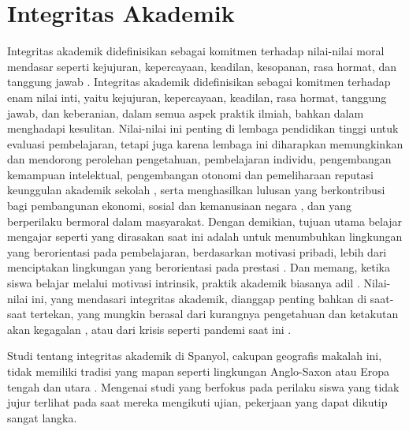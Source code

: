 \section{Integritas Akademik}
\label{sec:integritasakademik}

Integritas akademik didefinisikan sebagai komitmen terhadap nilai-nilai moral mendasar seperti kejujuran, kepercayaan, keadilan, kesopanan, rasa hormat, dan tanggung jawab \citet{keohane1999fundamental}. Integritas akademik didefinisikan sebagai komitmen terhadap enam nilai inti, yaitu kejujuran, kepercayaan, keadilan, rasa hormat, tanggung jawab, dan keberanian, dalam semua aspek praktik ilmiah, bahkan dalam menghadapi kesulitan. Nilai-nilai ini penting di lembaga pendidikan tinggi untuk evaluasi pembelajaran, tetapi juga karena lembaga ini diharapkan memungkinkan dan mendorong perolehan pengetahuan, pembelajaran individu, pengembangan kemampuan intelektual, pengembangan otonomi dan pemeliharaan reputasi keunggulan akademik sekolah \citep{ahmed2018student} \citep{nuss1984academic}, serta menghasilkan lulusan yang berkontribusi bagi pembangunan ekonomi, sosial dan kemanusiaan negara \citep{muhammad2020factors}, dan yang berperilaku bermoral dalam masyarakat. Dengan demikian, tujuan utama belajar mengajar seperti yang dirasakan saat ini adalah untuk menumbuhkan lingkungan yang berorientasi pada pembelajaran, berdasarkan motivasi pribadi, lebih dari menciptakan lingkungan yang berorientasi pada prestasi \citep{bertram2017academic}. Dan memang, ketika siswa belajar melalui motivasi intrinsik, praktik akademik biasanya adil \citep{barbaranelli2018machiavellian} \citep{krou2020achievement}. Nilai-nilai ini, yang mendasari integritas akademik, dianggap penting bahkan di saat-saat tertekan, yang mungkin berasal dari kurangnya pengetahuan dan ketakutan akan kegagalan \citep{keohane1999fundamental}, atau dari krisis seperti pandemi saat ini \citep{moralista2020faculty}. 

Studi tentang integritas akademik di Spanyol, cakupan geografis makalah ini, tidak memiliki tradisi yang mapan seperti lingkungan Anglo-Saxon atau Eropa tengah dan utara \citep{forgas2009ciberplagio}. Mengenai studi yang berfokus pada perilaku siswa yang tidak jujur terlihat pada saat mereka mengikuti ujian, pekerjaan yang dapat dikutip sangat langka.

